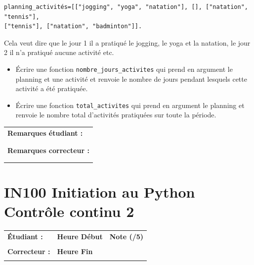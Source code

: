 \documentclass[a4paper,11pt]{article}
\begin{document}
\begin{verbatim}
planning_activités=[["jogging", "yoga", "natation"], [], ["natation", "tennis"], 
["tennis"], ["natation", "badminton"]].
\end{verbatim}

Cela veut dire que le jour 1 il a pratiqué le jogging, le yoga et la natation, le jour 2 il n'a pratiqué aucune activité etc. 
\begin{itemize}
\item[1.] Écrire une fonction \texttt{nombre\_jours\_activites} qui prend en argument le planning et une activité et renvoie
le nombre de jours pendant lesquels cette activité a été pratiquée.
\item[2.]  Écrire une fonction \texttt{total\_activites} qui prend en argument le planning et renvoie
le nombre total d'activités pratiquées sur toute la période. 
\end{itemize}


\vspace{1 cm}

\begin{table}[h!]
\centering
\renewcommand{\arraystretch}{1.4} %
\begin{tabular}{|p{15cm}|}
\hline
\textbf{Remarques étudiant :}    \\
 \\
 \\
\hline
\textbf{Remarques correcteur :}  \\
 \\
 \\
\hline
\end{tabular}
\end{table}

\newpage

\section*{\center IN100 Initiation au Python\\
Contrôle continu 2}


\begin{table}[h!]
\centering
\renewcommand{\arraystretch}{1.4} %
\begin{tabular}{|p{10cm}|p{3cm}|p{2cm}|}
\hline
\textbf{Étudiant :} & \textbf{Heure Début }  & \textbf{Note (/5) }  \\
& & \\
\hline
\textbf{Correcteur :} & \textbf{Heure Fin } & \\
& & \\
\hline

\hline
\end{tabular}
\end{table}
\vspace{-0.3 cm}
\end{document}
